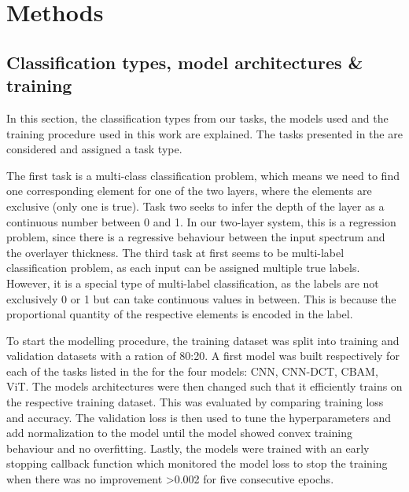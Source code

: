 
\chapter{Methods} %

\label{Chapter3} %







\section{Classification types, model architectures \& training}
In this section, the classification types from our tasks, the models used and the training procedure used in this work are explained.
The tasks presented in the  are considered and assigned a task type.

The first task is a multi-class classification problem, which means we need to find one corresponding element for one of the two layers, where the elements are exclusive (only one is true). Task two seeks to infer the depth of the layer as a continuous number between 0 and 1. In our two-layer system, this is a regression problem, since there is a regressive behaviour between the input spectrum and the overlayer thickness. 
The third task at first seems to be multi-label classification problem, as each input can be assigned multiple true labels. However, it is a special type of multi-label classification, as the labels are not exclusively 0 or 1 but can take continuous values in between. This is because the proportional quantity of the respective elements is encoded in the label. 


To start the modelling procedure, the training dataset was split into training and validation datasets with a ration of 80:20. A first model was built respectively for each of the tasks listed in the  for the four models: CNN, CNN-DCT, CBAM, ViT. The models architectures were then changed such that it efficiently trains on the respective training dataset. This was evaluated by comparing training loss and accuracy.
The validation loss is then used to tune the hyperparameters and add normalization to the model until the model showed convex training behaviour and no overfitting. Lastly, the models were trained with an early stopping callback function which monitored the model loss to stop the training when there was no improvement >0.002 for five consecutive epochs.

